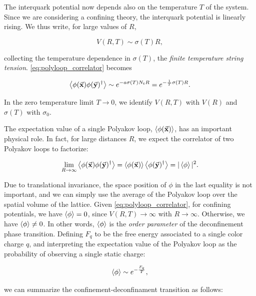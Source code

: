 \documentclass[reqno,12pt]{article}
\numberwithin{equation}{section}
\begin{document}
The interquark potential now depends also on the temperature $T$ of the system. Since we are considering a confining theory,
the interquark potential is linearly rising. We thus write, for large values of $R$,

\begin{equation}
	V(R, T) \sim \sigma(T) R,
\end{equation}

collecting the temperature dependence in $\sigma(T)$, the \textit{finite temperature string tension}. 
\eqref{eq:polyloop_correlator} becomes

\begin{equation}
	\expval{\phi(\va{x}) \phi(\va{y})^\dagger} \sim e^{-a\sigma(T)N_t R} = e^{-\frac{1}{T}\sigma(T) R}. 
\end{equation}

In the zero temperature limit $T \rightarrow 0$, we identify $V(R, T)$ with $V(R)$ and $\sigma(T)$ with $\sigma_0$.

The expectation value of a single Polyakov loop, $\expval{\phi(\va{x})}$, has an important physical role. In fact,
for large distances $R$, we expect the correlator of two Polyakov loops to factorize:

\begin{equation}
	\lim_{R \rightarrow \infty} \expval{\phi(\va{x})\phi(\va{y})^\dagger} = 
	\expval{\phi(\va{x})}\expval{\phi(\va{y})^\dagger} = |\expval{\phi}|^2.
\end{equation}

Due to translational invariance, the space position of $\phi$ in the last equality is not important, and we can simply
use the average of the Polyakov loop over the spatial volume of the lattice. Given \eqref{eq:polyloop_correlator}, for 
confining potentials, we have $\expval{\phi} = 0$, since $V(R, T) \rightarrow \infty$ with $R \rightarrow \infty$. Otherwise,
we have $\expval{\phi} \neq 0$. In other words, $\expval{\phi}$ is the \textit{order parameter} of the deconfinement phase
transition. Defining $F_q$ to be the free energy associated to a single color charge $q$, and interpreting the expectation
value of the Polyakov loop as the probability of observing a single static charge:

\begin{equation}
	\expval{\phi} \sim e^{-\frac{F_q}{T}},
\end{equation}

we can summarize the confinement-deconfinament transition as follows:
\end{document}
